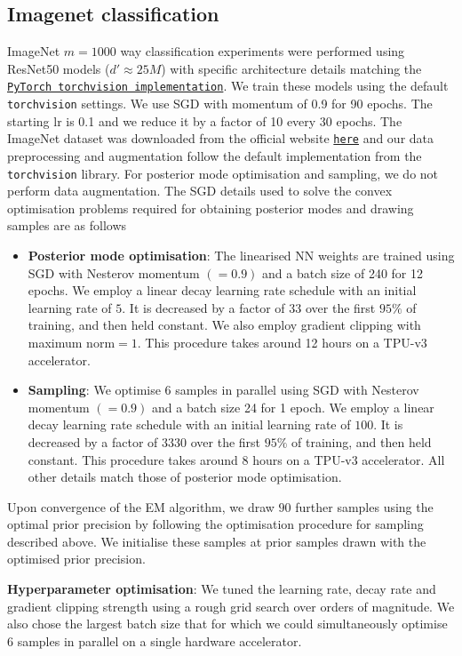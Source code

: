 \subsection{Imagenet classification}
\label{app:imagenet_experiments}
ImageNet $m{=}1000$ way classification experiments were performed using ResNet50 models ($d'\approx 25M$) with specific architecture details matching the \href{https://pytorch.org/vision/main/models.html}{\texttt{PyTorch torchvision implementation}}. We train these models using the default \texttt{torchvision} settings. We use SGD with momentum of 0.9 for 90 epochs. The starting lr is 0.1 and we reduce it by a factor of 10 every 30 epochs. The ImageNet dataset was downloaded from the official website \href{https://www.image-net.org/}{\texttt{here}} and our data preprocessing and augmentation follow the default implementation from the \texttt{torchvision} library. For posterior mode optimisation and sampling, we do not perform data augmentation.
The SGD details used to solve the convex optimisation problems required for obtaining posterior modes and drawing samples are as follows
\begin{itemize}
    \item \textbf{Posterior mode optimisation}: The linearised NN weights are trained using SGD with Nesterov momentum $({=}0.9)$ and a batch size of 240 for 12 epochs. We employ a linear decay learning rate schedule with an initial learning rate of $5$. It is decreased by a factor of $33$ over the first $95\%$ of training, and then held constant. We also employ gradient clipping with maximum norm$=1$. This procedure takes around 12 hours on a TPU-v3 accelerator.
    \item \textbf{Sampling}: We optimise $6$ samples in parallel using SGD with Nesterov momentum $({=}0.9)$ and a batch size 24 for 1 epoch. We employ a linear decay learning rate schedule with an initial learning rate of $100$. It is decreased by a factor of $3330$ over the first $95\%$ of training, and then held constant. This procedure takes around 8 hours on a TPU-v3 accelerator. All other details match those of posterior mode optimisation.
\end{itemize}
Upon convergence of the EM algorithm, we draw $90$ further samples using the optimal prior precision by following the optimisation procedure for sampling described above. We initialise these samples at prior samples drawn with the optimised prior precision.

\textbf{Hyperparameter optimisation}: We tuned the learning rate, decay rate and gradient clipping strength using a rough grid search over orders of magnitude. We also chose the largest batch size that for which we could simultaneously optimise $6$ samples in parallel on a single hardware accelerator.

